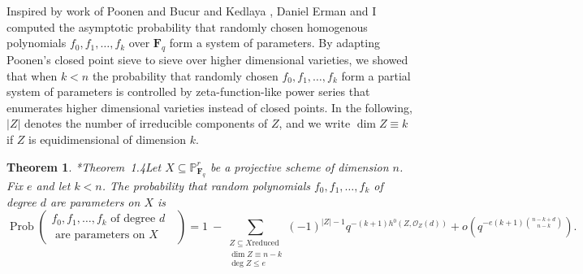 \documentclass[11pt,reqno]{amsart}
\newtheorem{theorem}[lemma]{Theorem}
\newtheorem{cor}[lemma]{Corollary}
\theoremstyle{remark}
\newcommand{\Prob}{\operatorname{Prob}}
\newcommand{\fF}{\mathbf F}
\renewcommand{\O}{\mathcal{O}}
\renewcommand{\P}{\mathbb{P}}
\begin{document}
Inspired by work of Poonen \cite{poonen04} and Bucur and Kedlaya \cite{bucurKedlaya12}, Daniel Erman and I computed the asymptotic probability that randomly chosen homogenous polynomials $f_{0},f_{1},\ldots,f_{k}$ over $\fF_{q}$ form a system of parameters. By adapting Poonen's closed point sieve to sieve over higher dimensional varieties, we showed that when $k<n$ the probability that randomly chosen $f_{0},f_{1},\ldots,f_{k}$ form a partial system of parameters is controlled by zeta-function-like power series that enumerates higher dimensional varieties instead of closed points. In the following, $|Z|$ denotes the number of irreducible components of $Z$, and we write $\dim Z \equiv k$ if $Z$ is equidimensional of dimension $k$. 

\begin{theorem}\cite{bruceErman-sop}*{Theorem~1.4}\label{thm:main finite field}
Let $X\subseteq \P^r_{\fF_q}$ be a projective scheme of dimension $n$. Fix $e$ and let $k<n$. The probability that random polynomials $f_0,f_1,\dots,f_k$ of degree $d$ are parameters on $X$ is
\[
\Prob\left(\begin{matrix}f_0,f_1,\dots,f_{k} \text{ of degree $d$ } \\ \text{ are parameters on $X$}\end{matrix}\right) = 1 \ - 
\sum_{\begin{smallmatrix}Z\subseteq X \text{reduced} \\ \dim Z \equiv n-k\\ \deg Z \leq e  \end{smallmatrix}}(-1)^{|Z|-1}q^{-(k+1)h^0(Z,\O_Z(d))}+ o\left(q^{-e(k+1)\binom{n-k+d}{n-k}}\right).
\]
\end{theorem}


\end{document}
